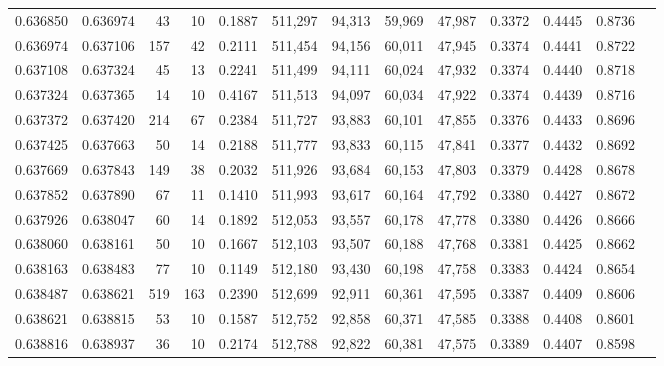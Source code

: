 \begin{tabular}{rrrrrrrrrrrrr}
0.636850 & 0.636974 &    43 &  10 &                                     0.1887 & 511,297 &  94,313 &  59,969 &  47,987 & 0.3372 & 0.4445 & 0.8736 \\
0.636974 & 0.637106 &   157 &  42 &                                     0.2111 & 511,454 &  94,156 &  60,011 &  47,945 & 0.3374 & 0.4441 & 0.8722 \\
0.637108 & 0.637324 &    45 &  13 &                                     0.2241 & 511,499 &  94,111 &  60,024 &  47,932 & 0.3374 & 0.4440 & 0.8718 \\
0.637324 & 0.637365 &    14 &  10 &                                     0.4167 & 511,513 &  94,097 &  60,034 &  47,922 & 0.3374 & 0.4439 & 0.8716 \\
0.637372 & 0.637420 &   214 &  67 &                                     0.2384 & 511,727 &  93,883 &  60,101 &  47,855 & 0.3376 & 0.4433 & 0.8696 \\
0.637425 & 0.637663 &    50 &  14 &                                     0.2188 & 511,777 &  93,833 &  60,115 &  47,841 & 0.3377 & 0.4432 & 0.8692 \\
0.637669 & 0.637843 &   149 &  38 &                                     0.2032 & 511,926 &  93,684 &  60,153 &  47,803 & 0.3379 & 0.4428 & 0.8678 \\
0.637852 & 0.637890 &    67 &  11 &                                     0.1410 & 511,993 &  93,617 &  60,164 &  47,792 & 0.3380 & 0.4427 & 0.8672 \\
0.637926 & 0.638047 &    60 &  14 &                                     0.1892 & 512,053 &  93,557 &  60,178 &  47,778 & 0.3380 & 0.4426 & 0.8666 \\
0.638060 & 0.638161 &    50 &  10 &                                     0.1667 & 512,103 &  93,507 &  60,188 &  47,768 & 0.3381 & 0.4425 & 0.8662 \\
0.638163 & 0.638483 &    77 &  10 &                                     0.1149 & 512,180 &  93,430 &  60,198 &  47,758 & 0.3383 & 0.4424 & 0.8654 \\
0.638487 & 0.638621 &   519 & 163 &                                     0.2390 & 512,699 &  92,911 &  60,361 &  47,595 & 0.3387 & 0.4409 & 0.8606 \\
0.638621 & 0.638815 &    53 &  10 &                                     0.1587 & 512,752 &  92,858 &  60,371 &  47,585 & 0.3388 & 0.4408 & 0.8601 \\
0.638816 & 0.638937 &    36 &  10 &                                     0.2174 & 512,788 &  92,822 &  60,381 &  47,575 & 0.3389 & 0.4407 & 0.8598 \\

\end{tabular}
